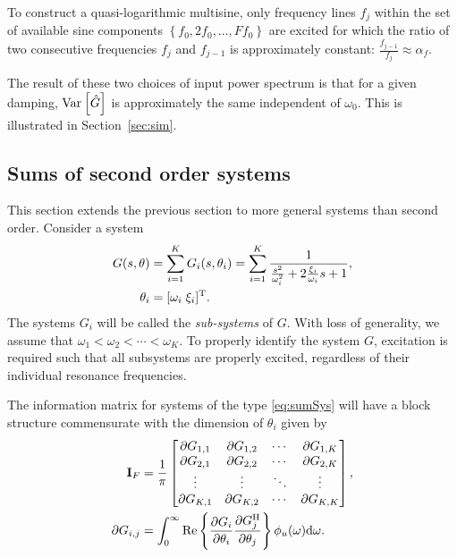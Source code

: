 To construct a quasi-logarithmic multisine, only frequency lines $f_j$ within the set of available sine components $\left\{f_0, 2 f_0, \ldots, F f_0  \right\}$ are excited for which the ratio of two consecutive frequencies $f_j$ and $f_{j-1}$ is approximately constant: $\frac{f_{j-1}}{f_j} \approx \alpha_f$.

The result of these two choices of input power spectrum is that for a given damping, $\operatorname{\mathrm{Var}}_{} \left[ \hat{G} \right]$ is approximately the same independent of $\omega_0$. 
This is illustrated in Section~\ref{sec:sim}.

\subsection{Sums of second order systems}
This section extends the previous section to more general systems than second order.
Consider a system
\begin{align}
G(s,\theta) &= \sum_{i=1}^{K} G_i(s,\theta_i)
             =\sum_{i=1}^{K}  \frac{1}
                                   {   \frac{s^2}{\omega_i^2}
                                    + 2\frac{\xi_i}{\omega_i}s
                                    + 1},\\
\theta_i&=[\omega_i\;\xi_i]^{\mathrm{T}}.
\label{eq:sumSys}
\end{align}
The systems  $G_i$ will be called the \emph{sub-systems} of $G$. With loss of generality, we assume that $\omega_1 < \omega_2 < \cdots < \omega_K$. To properly identify the system $G$, excitation is required such that all
subsystems are properly excited, regardless of their individual resonance frequencies.

The information matrix for systems of the type \eqref{eq:sumSys} will have a block structure commensurate with the dimension of $\theta_i$ given by
\begin{align}
\mathbf{I}_F &= \frac{1}{\pi}
\begin{bmatrix}
  \partial G_{1,1}        &\partial G_{1,2}       &\cdots         &\partial G_{1,K}\\
  \partial G_{2,1}        &\partial G_{2,2}       &\cdots         &\partial G_{2,K}\\
  \vdots                  &\vdots                 &\ddots         &\vdots          \\
  \partial G_{K,1}        &\partial G_{K,2}       &\cdots         &\partial G_{K,K}
\end{bmatrix},\\
\partial G_{i,j} &= \int_0^\infty
                      \mathrm{Re}\left\{
                          \frac{\partial G_i}
                               {\partial \theta_i}
                          \frac{\partial G_j^{\mathrm{H}}}
                               {\partial \theta_j}
                                \right\}
                      \phi_u(\omega)\mathrm{d}\omega.
\end{align}

